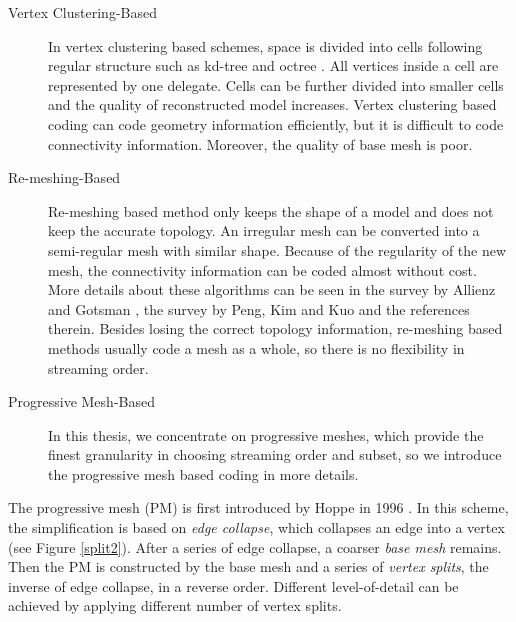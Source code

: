    \begin{description}
        \item[Vertex Clustering-Based] 
            In vertex clustering based schemes, space is divided into cells
            following regular structure such as kd-tree \cite{566591} and 
            octree \cite{1073237}. All vertices inside a cell are represented
            by one delegate. Cells can be further divided into smaller cells
            and the quality of reconstructed model increases. Vertex clustering
            based coding can code geometry information efficiently, but it is 
            difficult to code connectivity information. Moreover, the quality
            of base mesh is poor.

        \item[Re-meshing-Based]
            Re-meshing based method only keeps the shape of a model
            and does not keep the accurate topology. 
            An irregular mesh can be converted into a semi-regular mesh
            with similar shape. 
            Because of the regularity of the new mesh,
            the connectivity information can be coded almost without cost.
            More details about these algorithms can be seen in the survey by Allienz and Gotsman
            \cite{recent:alliez}, the survey by Peng, Kim and Kuo
            \cite{technologies:peng} and the references therein.
            Besides losing the correct topology information,
            re-meshing based methods usually code a mesh as a whole, 
            so there is no flexibility in streaming order.

        \item[Progressive Mesh-Based]
            In this thesis, we concentrate on progressive meshes, which provide 
            the finest granularity in choosing streaming order and subset, 
            so we introduce the progressive mesh based coding in more details.
    \end{description}

    The progressive mesh (PM) \label{progressive_mesh}is first
    introduced by Hoppe in 1996 \cite{hoppe96progressive}. In this
    scheme, the simplification is based on \emph{edge collapse}, which
    collapses an edge into a vertex (see Figure \ref{split2}).
    After a series of edge collapse, a coarser \emph{base mesh} remains. 
    Then the PM is constructed by the base mesh and a series of \emph{vertex
    splits}, the inverse of edge collapse, in a reverse order.
    Different level-of-detail can be achieved by applying different number
    of vertex splits.

